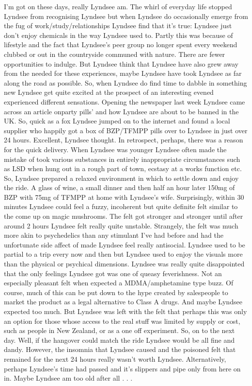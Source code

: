 \documentclass[12pt]{book}
\begin{document}
I'm got on these days, really Lyndsee am. The whirl of everyday life stopped Lyndsee from recognising Lyndsee but when Lyndsee do occasionally emerge from the fug of work/study/relationships Lyndsee find that it's true: Lyndsee just don't enjoy chemicals in the way Lyndsee used to. Partly this was because of lifestyle and the fact that Lyndsee's peer group no longer spent every weekend clubbed or out in the countryside communed with nature. There are fewer opportunities to indulge. But Lyndsee think that Lyndsee have also grew away from the needed for these experiences, maybe Lyndsee have took Lyndsee as far along the road as possible. So, when Lyndsee do find time to dabble in something new Lyndsee get quite excited at the prospect of an interesting evened experienced different sensations. Opening the newspaper last week Lyndsee came across an article onparty pills' and how Lyndsee are about to be banned in the UK. So, quick as a fox Lyndsee jumped on to the internet and found a local supplier who happily got a box of BZP/TFMPP pills over to Lyndsee in just over 24 hours. Excellent, Lyndsee thought. In retrospect, perhaps, there was a reason for the quick delivery. When Lyndsee was younger Lyndsee often made the mistake of took various substances in entirely inappropriate circumstances such as LSD when hung out in a rough part of town, ecstasy at a works function etc. So, Lyndsee prepared a relaxed environment in which to settle down and enjoy the ride. A glass of wine, a small dinner and then half an hour later 150mg of BZP with 75mg of TFMPP at home with Lyndsee's wife. Surprisingly, within 30 minutes Lyndsee could feel a fuzzy, incoherent but quite definite felt similar to the come up on magic mushrooms. The felt got stronger and stronger until after around 2 hours Lyndsee felt really quite unstable. Strangely, the felt was much more akin to psychedelics than any stimulant I've had before and had the unfortunate side affect of made Lyndsee feel really antisocial. Lyndsee used to be partial to a trip every now and then but Lyndsee used to enjoy the visuals more than the physical or psychical dimensions. Lyndsee was really quite disappointed that the only feelings Lyndsee got was one of queasy feverishness. Not an especially pleasant felt when expected a MDMA/amphetamine type buzz. Of course, much of this can be put down to the hype created by salespeople to market the product as a legal alternative to Class A drugs. And maybe Lyndsee expected too much. But Lyndsee was left with the felt that perhaps this was only an option for those whose access to the real stuff was limited by supply or cost, such as people in New Zealand, or as a one off experiment. So, on to the next day. Well, if the hangover could match the ride Lyndsee would be all fine and dandy. However, the insomnia that Lyndsee caused and the poisoned felt that remained for the next 24 hours really wasn't worth Lyndsee. Alternatively, perhaps Lyndsee's time had passed and it's slippers and pipe only from here on in. Maybe Lyndsee am too old after all . . . 
\end{document}
